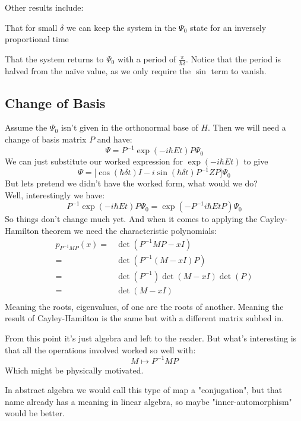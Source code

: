 Other results include:

That for small $\delta$ we can keep the system in the $\Psi_0$ state for an inversely proportional time

That the system returns to $\Psi_0$ with a period of $\frac{\pi}{\hbar\delta}$.
Notice that the period is halved from the naïve value, 
as we only require the $\sin$ term to vanish.

\subsection{Change of Basis}
Assume the $\Psi_0$ isn't given in the orthonormal base of $H$.
Then we will need a change of basis matrix $P$ and have:
\[\Psi = P^{-1}\exp(-i\hbar E t)P\Psi_0\]
We can just substitute our worked expression for $\exp(-i\hbar Et)$ to give
\[\Psi = \big[\cos(\hbar\delta t)I-i\sin(\hbar\delta t)P^{-1}ZP\big]\Psi_0 \]
But lets pretend we didn't have the worked form,
what would we do?
\\

Well, interestingly we have:
\[P^{-1}\exp(-i\hbar E t)P\Psi_0= \exp(-P^{-1}i\hbar E tP)\Psi_0\]
So things don't change much yet.
And when it comes to applying the Cayley-Hamilton theorem we need the characteristic polynomials:
\begin{equation*}
\begin{aligned}
p_{P^{-1}MP}(x) =& \det(P^{-1}MP-xI) \\
=&\det(P^{-1}(M-xI)P) \\
=&\det(P^{-1})\det(M-xI)\det(P) \\
=&\det(M-xI) \\
\end{aligned}
\end{equation*}
Meaning the roots, eigenvalues, of one are the roots of another.
Meaning the result of Cayley-Hamilton is the same but with a different matrix subbed in.

From this point it's just algebra and left to the reader.
But what's interesting is that all the operations involved worked so well with:
\[M\mapsto P^{-1}MP\]
Which might be physically motivated.

In abstract algebra we would call this type of map a "conjugation", 
but that name already has a meaning in linear algebra,
so maybe "inner-automorphism" would be better.
